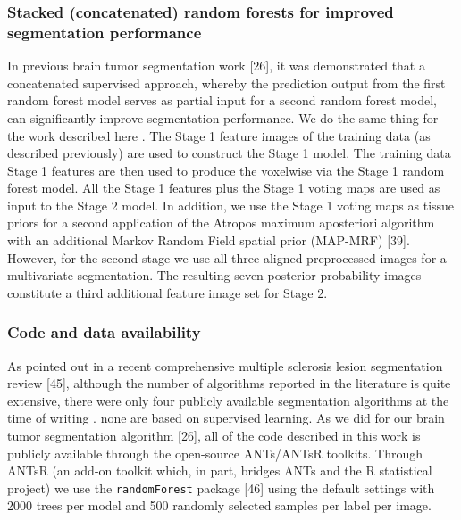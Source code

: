 \documentclass[11pt,]{article}
\begin{document}
\subsubsection{Stacked (concatenated) random forests for improved
segmentation
performance}\label{stacked-concatenated-random-forests-for-improved-segmentation-performance}

In previous brain tumor segmentation work {[}26{]}, it was demonstrated
that a concatenated supervised approach, whereby the prediction output
from the first random forest model serves as partial input for a second
random forest model, can significantly improve segmentation performance.
We do the same thing for the work described here
.
The Stage 1 feature images of the training data (as described
previously) are used to construct the Stage 1 model. The training data
Stage 1 features are then used to produce the voxelwise
via the Stage 1 random forest model. All the Stage 1 features plus the
Stage 1 voting maps are used as input to the Stage 2 model. In addition,
we use the Stage 1 voting maps as tissue priors
for a second application of the Atropos maximum aposteriori algorithm
with an additional Markov Random Field spatial prior (MAP-MRF) {[}39{]}.
However, for the second stage we use all three aligned preprocessed
images for a multivariate segmentation. The resulting seven posterior
probability images constitute a third additional feature image set for
Stage 2.

\subsubsection{Code and data
availability}\label{code-and-data-availability}

As pointed out in a recent comprehensive multiple sclerosis lesion
segmentation review {[}45{]}, although the number of algorithms reported
in the literature is quite extensive, there were only four publicly
available segmentation algorithms at the time of writing
.
 none are
based on supervised learning. As we did for our brain tumor segmentation
algorithm {[}26{]}, all of the code described in this work is publicly
available through the open-source ANTs/ANTsR toolkits. Through ANTsR (an
add-on toolkit which, in part, bridges ANTs and the R statistical
project) we use the \texttt{randomForest} package {[}46{]} using the
default settings with 2000 trees per model and 500 randomly selected
samples per label per image.
\end{document}
